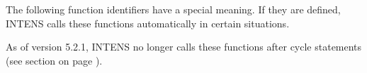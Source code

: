 

\label{sec:funcidentifiers}

The following function identifiers have a special meaning.
If they are defined, INTENS calls these functions automatically in certain situations.

As of version 5.2.1, INTENS no longer calls these functions after cycle statements
(see section  on page \pageref{fu:cycle:statement}).

